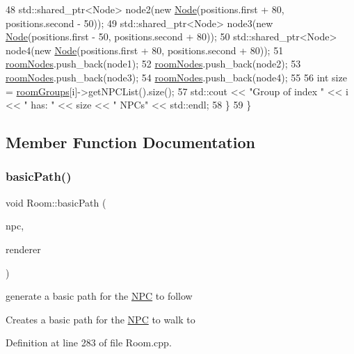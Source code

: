 \begin{DoxyCode}
48         std::shared\_ptr<Node> node2(\textcolor{keyword}{new} \hyperlink{class_node}{Node}(positions.first + 80, positions.second - 50));
49         std::shared\_ptr<Node> node3(\textcolor{keyword}{new} \hyperlink{class_node}{Node}(positions.first - 50, positions.second + 80));
50         std::shared\_ptr<Node> node4(\textcolor{keyword}{new} \hyperlink{class_node}{Node}(positions.first + 80, positions.second + 80));
51         \hyperlink{class_room_adcf7b7bd55783c0e80b2508ce9485d78}{roomNodes}.push\_back(node1);
52         \hyperlink{class_room_adcf7b7bd55783c0e80b2508ce9485d78}{roomNodes}.push\_back(node2);
53         \hyperlink{class_room_adcf7b7bd55783c0e80b2508ce9485d78}{roomNodes}.push\_back(node3);
54         \hyperlink{class_room_adcf7b7bd55783c0e80b2508ce9485d78}{roomNodes}.push\_back(node4);
55 
56         \textcolor{keywordtype}{int} size = \hyperlink{class_room_a2d63fa17f30d50dd5267f04170a662b0}{roomGroups}[i]->getNPCList().size();
57         std::cout << \textcolor{stringliteral}{"Group of index "} << i << \textcolor{stringliteral}{" has: "} << size << \textcolor{stringliteral}{" NPCs"} << std::endl;
58     \}
59 \}
\end{DoxyCode}


\subsection{Member Function Documentation}
\mbox{\label{class_room_af25611552daa6c57915a0b0c98c40a8a}} 
\subsubsection{\texorpdfstring{basic\+Path()}{basicPath()}}
{\footnotesize\ttfamily void Room\+::basic\+Path (\begin{DoxyParamCaption}\item[{std\+::shared\+\_\+ptr$<$ \hyperlink{class_n_p_c}{N\+PC} $>$}]{npc,  }\item[{S\+D\+L\+\_\+\+Renderer $\ast$}]{renderer }\end{DoxyParamCaption})}



generate a basic path for the \hyperlink{class_n_p_c}{N\+PC} to follow 

Creates a basic path for the \hyperlink{class_n_p_c}{N\+PC} to walk to 

Definition at line 283 of file Room.\+cpp.




